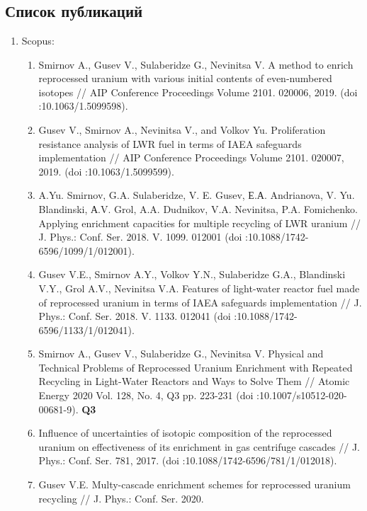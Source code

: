 \chapter{}

\section{Список публикаций}
\begin{enumerate}
	\item Scopus:
    \begin{enumerate}
        \item Smirnov A., Gusev V., Sulaberidze G., Nevinitsa V. A method to enrich reprocessed uranium with various initial contents of even-numbered isotopes // AIP Conference Proceedings Volume 2101. 020006, 2019. (doi :10.1063/1.5099598).
        \item Gusev V., Smirnov A., Nevinitsa V., and Volkov Yu. Proliferation resistance analysis of LWR fuel in terms of IAEA safeguards implementation // AIP Conference Proceedings Volume 2101. 020007, 2019. (doi :10.1063/1.5099599).
        \item A.Yu. Smirnov, G.A. Sulaberidze, V. E. Gusev, Е.А. Andrianova, V. Yu. Blandinski, А.V. Grol, A.A. Dudnikov, V.A. Nevinitsa, P.A. Fomichenko. Applying enrichment capacities for multiple recycling of LWR uranium //  J. Phys.: Conf. Ser. 2018. V. 1099. 012001 (doi :10.1088/1742-6596/1099/1/012001).
        \item Gusev V.E., Smirnov A.Y., Volkov Y.N., Sulaberidze G.A., Blandinski V.Y., Grol A.V., Nevinitsa V.A. Features of light-water reactor fuel made of reprocessed uranium in terms of IAEA safeguards implementation // J. Phys.: Conf. Ser. 2018. V. 1133. 012041  (doi :10.1088/1742-6596/1133/1/012041).
        \item Smirnov A., Gusev V., Sulaberidze G., Nevinitsa V. Physical and Technical Problems of Reprocessed Uranium Enrichment with Repeated Recycling in Light-Water Reactors and Ways to Solve Them //  Atomic Energy 2020 Vol. 128, No. 4, Q3 pp. 223-231 (doi :10.1007/s10512-020-00681-9). \textbf{Q3}
        \item Influence of uncertainties of isotopic composition of the reprocessed uranium on effectiveness of its enrichment in gas centrifuge cascades // J. Phys.: Conf. Ser. 781, 2017. (doi :10.1088/1742-6596/781/1/012018).
        \item   Gusev V.E. Multy-cascade enrichment schemes for reprocessed uranium recycling // J. Phys.: Conf. Ser. 2020.

\end{enumerate}
\end{enumerate}
